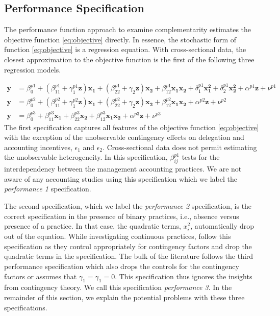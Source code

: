 \documentclass[12pt]{article}
\begin{document}
\subsection{Performance Specification}

The performance function approach to examine complementarity estimates the objective function \eqref{eq:objective} directly. In essence, the stochastic form of function \eqref{eq:objective} is a regression equation. With cross-sectional data, the closest approximation to the objective function is the first of the following three regression models.  

\begin{align*}
\mathbf{y} &=  \beta^{p1}_0 + (\beta^{p1}_{11} + \gamma_1^{p1} \mathbf{z} )\mathbf{x_1} 
						+ (\beta_{22}^{p1} + \gamma_2 \mathbf{z} ) \mathbf{x_2} 
                        + \beta_{12}^{p1} \mathbf{x_1} \mathbf{x_2} 
                        + \delta_1^{p1} \mathbf{x^2_1} + \delta_2^{p1} \mathbf{x^2_2} 
                        + \alpha^{p1} \mathbf{z}
                        + \nu^{p1} \\
 \mathbf{y} &=  \beta^{p2}_0 + (\beta^{p2}_{11} + \gamma_1^{p2} \mathbf{z} )\mathbf{x_1} 
						+ (\beta_{22}^{p2} + \gamma_2 \mathbf{z} ) \mathbf{x_2} 
                        + \beta_{12}^{p2} \mathbf{x_1} \mathbf{x_2} 
                        + \alpha^{p2} \mathbf{z}
                        + \nu^{p2} \\
 \mathbf{y} &=  \beta^{p3}_0 + \beta^{p3}_{11} \mathbf{x_1} 
						+ \beta_{22}^{p3} \mathbf{x_2} 
                        + \beta_{12}^{p3} \mathbf{x_1} \mathbf{x_2} 
                        + \alpha^{p3} \mathbf{z}
                        + \nu^{p3}
\end{align*}
The first specification captures all features of the objective function \eqref{eq:objective} with the exception of the unobservable contingency effects on delegation and accounting incentives, $\epsilon_1$ and $\epsilon_2$. Cross-sectional data does not permit estimating the unobservable heterogeneity. In this specification, \(\beta_{ij}^{p1}\) tests for the interdependency between the management accounting practices. We are not aware of any accounting studies using this specification which we label the \emph{performance 1} specification. 

The second specification, which we label the \emph{performance 2} specification, is the correct specification in the presence of binary practices, i.e., absence versus presence of a practice. In that case, the quadratic terms, $x_i^2$, automatically drop out of the equation. While investigating continuous practices, \citet{ bedford_management_2016, bedford_performance_2019} follow this specification as they control appropriately for contingency factors and drop the quadratic terms in the specification. The bulk of the literature follows the third performance specification which also drops the controls for the contingency factors or assumes that $\gamma_1 = \gamma_1 = 0$. This specification thus ignores the insights from contingency theory. We call this specification \emph{performance 3}. In the remainder of this section, we explain the potential problems with these three specifications.
\end{document}
